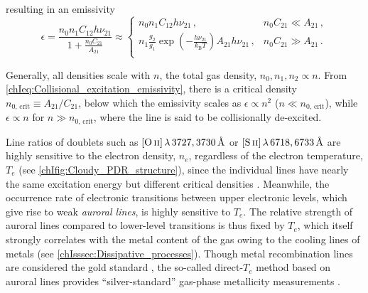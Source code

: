 \noindent resulting in an emissivity
\begin{equation}
    \label{chIeq:Collisional_excitation_emissivity}
    \epsilon = \frac{n_0 n_1 C_{12} h \nu_{21}}{1 + \frac{n_0 C_{21}}{A_{21}}} \approx \left\{
    \begin{array}{ll}
         n_0 n_1 C_{12} h \nu_{21} \, , & n_0 C_{21} \ll A_{21} \, , \\
        
         n_1 \frac{g_2}{g_1} \exp \left( - \frac{h \nu_{21}}{k_\text{B} T} \right) A_{21} h \nu_{21} \, , & n_0 C_{21} \gg A_{21} \, . \\
    \end{array}
    \right.
\end{equation}

Generally, all densities scale with $n$, the total gas density, $n_0, n_1, n_2 \propto n$. From \cref{chIeq:Collisional_excitation_emissivity}, there is a critical density $n_{0, \, \text{crit}} \equiv A_{21}/C_{21}$, below which the emissivity scales as $\epsilon \propto n^2$ ($n \ll n_{0, \, \text{crit}}$), while $\epsilon \propto n$ for $n \gg n_{0, \, \text{crit}}$, where the line is said to be collisionally de-excited.

Line ratios of doublets such as $\OII \, \lambda \, 3727, 3730 \, \Angstrom$ or $\SII \, \lambda \, 6718, 6733 \, \Angstrom$ are highly sensitive to the electron density, $n_e$, regardless of the electron temperature, $T_e$ (see \cref{chIfig:Cloudy_PDR_structure}), since the individual lines have nearly the same excitation energy but different critical densities . Meanwhile, the occurrence rate of electronic transitions between upper electronic levels, which give rise to weak \textit{auroral lines}, is highly sensitive to $T_e$. The relative strength of auroral lines compared to lower-level transitions is thus fixed by $T_e$, which itself strongly correlates with the metal content of the gas owing to the cooling lines of metals (see \cref{chIsssec:Dissipative_processes}). Though metal recombination lines are considered the gold standard \citep[yet are practically unviable for distant galaxies;][]{2019ARA&A..57..511K}, the so-called direct-$T_e$ method based on auroral lines provides ``silver-standard'' gas-phase metallicity measurements \citep[e.g.][]{2016ApJ...825L..23S, 2021ApJ...914...19S, 2017MNRAS.465.1384C, 2022arXiv220712375C}.

